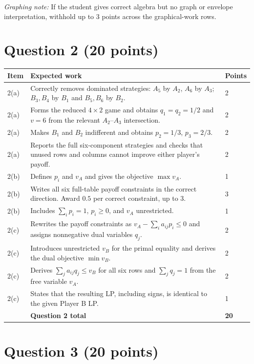 \documentclass[11pt,letterpaper]{article}
\newcommand{\rubricsection}[2]{%
  \section*{\color{hkustblue}Question #1 \normalfont\normalsize (#2 points)}
}
\begin{document}
\textit{Graphing note:} If the student gives correct algebra but no graph or envelope
interpretation, withhold up to 3 points across the graphical-work rows.

\rubricsection{2}{20}

\begin{longtable}{L{0.12\textwidth}L{0.72\textwidth}C{0.08\textwidth}}
\toprule
Item & Expected work & Points \\
(a) & Correctly removes dominated strategies: $A_5$ by $A_2$, $A_6$ by $A_3$;
$B_3,B_4$ by $B_1$ and $B_5,B_6$ by $B_2$. & 2\\
2(a) & Forms the reduced $4\times2$ game and obtains $q_1=q_2=1/2$ and $v=6$
from the relevant $A_2$--$A_3$ intersection. & 2\\
2(a) & Makes $B_1$ and $B_2$ indifferent and obtains
$p_2=1/3$, $p_3=2/3$. & 2\\
2(a) & Reports the full six-component strategies and checks that unused rows and
columns cannot improve either player's payoff. & 2\\
2(b) & Defines $p_i$ and $v_A$ and gives the objective $\max v_A$. & 1\\
2(b) & Writes all six full-table payoff constraints in the correct direction.  Award
$0.5$ per correct constraint, up to 3. & 3\\
2(b) & Includes $\sum_i p_i=1$, $p_i\ge0$, and $v_A$ unrestricted. & 1\\
2(c) & Rewrites the payoff constraints as
$v_A-\sum_i a_{ij}p_i\le0$ and assigns nonnegative dual variables $q_j$. & 2\\
2(c) & Introduces unrestricted $v_B$ for the primal equality and derives the dual
objective $\min v_B$. & 2\\
2(c) & Derives $\sum_j a_{ij}q_j\le v_B$ for all six rows and
$\sum_jq_j=1$ from the free variable $v_A$. & 2\\
2(c) & States that the resulting LP, including signs, is identical to the given
Player B LP. & 1\\
\midrule
& \textbf{Question 2 total} & \textbf{20}\\
\bottomrule
\end{longtable}

\rubricsection{3}{20}
\end{document}
